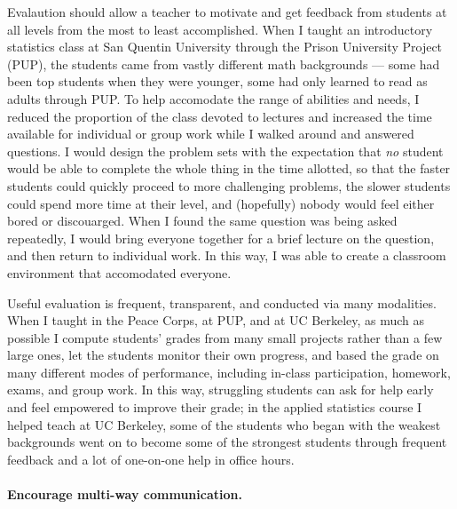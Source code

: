 Evalaution should allow a teacher to motivate and get feedback from students at
all levels from the most to least accomplished. When I taught an introductory
statistics class at San Quentin University through the Prison University Project
(PUP), the students came from vastly different math backgrounds --- some had
been top students when they were younger, some had only learned to read as
adults through PUP.  To help accomodate the range of abilities and needs, I
reduced the proportion of the class devoted to lectures and increased the time
available for individual or group work while I walked around and answered
questions.  I would design the problem sets with the expectation that \emph{no}
student would be able to complete the whole thing in the time allotted, so that
the faster students could quickly proceed to more challenging problems, the
slower students could spend more time at their level, and (hopefully) nobody
would feel either bored or discouarged.  When I found the same question was
being asked repeatedly, I would bring everyone together for a brief lecture on
the question, and then return to individual work.  In this way, I was able to
create a classroom environment that accomodated everyone.

Useful evaluation is frequent, transparent, and conducted via many modalities.
When I taught in the Peace Corps, at PUP, and at UC Berkeley, as much as
possible I compute students' grades from many small projects rather than a few
large ones, let the students monitor their own progress, and based the grade on
many different modes of performance, including in-class participation, homework,
exams, and group work.  In this way, struggling students can ask for help early
and feel empowered to improve their grade; in the applied statistics course I
helped teach at UC Berkeley, some of the students who began with the weakest
backgrounds went on to become some of the strongest students through frequent
feedback and a lot of one-on-one help in office hours.




\paragraph{Encourage multi-way communication.}

